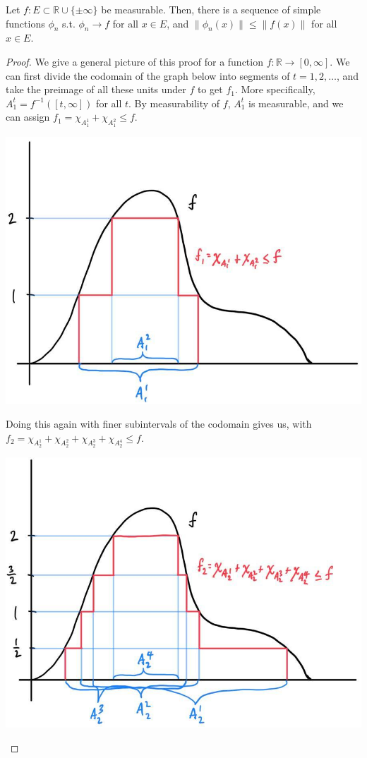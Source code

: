   \begin{theorem}
    Let $f: E \subset \mathbb{R} \cup \{ \pm \infty\}$ be measurable. Then, there is a sequence of simple functions $\phi_n$ s.t. $\phi_n \to f$ for all $x \in E$, and $\| \phi_n (x) \| \leq \| f(x) \|$ for all $x \in E$. 
  \end{theorem}
  \begin{proof}
    We give a general picture of this proof for a function $f: \mathbb{R} \longrightarrow [0, \infty]$. We can first divide the codomain of the graph below into segments of $t = 1, 2, \ldots$, and take the preimage of all these units under $f$ to get $f_1$. More specifically, $A_1^t = f^{-1} ([t, \infty])$ for all $t$. By measurability of $f$, $A_1^t$ is measurable, and we can assign $f_1 = \chi_{A^1_1} + \chi_{A_1^2} \leq f$. 
    \begin{center}
      \includegraphics[scale=0.23]{img/Lebesgue_1.jpg}
    \end{center}
    Doing this again with finer subintervals of the codomain gives us, with $f_2 = \chi_{A_2^1} + \chi_{A_2^2} + \chi_{A_2^3} + \chi_{A_2^4} \leq f$. 
    \begin{center}
      \includegraphics[scale=0.23]{img/Lebesgue_2.jpg}

\end{center}
\end{proof}
